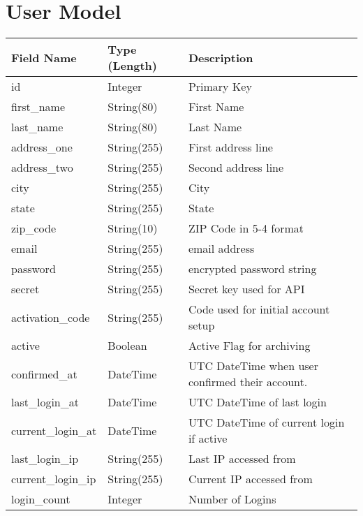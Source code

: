 \documentclass[letterpaper,10pt,english]{sphinxmanual}
\begin{document}
\section{User Model}
\label{dev-models:user-model-label}\label{dev-models:user-model}
\begin{tabulary}{\linewidth}{|L|L|L|}
\hline
\textsf{\relax 
Field Name
} & \textsf{\relax 
Type (Length)
} & \textsf{\relax 
Description
}\\
\hline
id
 & 
Integer
 & 
Primary Key
\\

first\_name
 & 
String(80)
 & 
First Name
\\

last\_name
 & 
String(80)
 & 
Last Name
\\

address\_one
 & 
String(255)
 & 
First address line
\\

address\_two
 & 
String(255)
 & 
Second address line
\\

city
 & 
String(255)
 & 
City
\\

state
 & 
String(255)
 & 
State
\\

zip\_code
 & 
String(10)
 & 
ZIP Code in 5-4 format
\\

email
 & 
String(255)
 & 
email address
\\

password
 & 
String(255)
 & 
encrypted password string
\\

secret
 & 
String(255)
 & 
Secret key used for API
\\

activation\_code
 & 
String(255)
 & 
Code used for initial account setup
\\

active
 & 
Boolean
 & 
Active Flag for archiving
\\

confirmed\_at
 & 
DateTime
 & 
UTC DateTime when user confirmed
their account.
\\

last\_login\_at
 & 
DateTime
 & 
UTC DateTime of last login
\\

current\_login\_at
 & 
DateTime
 & 
UTC DateTime of current login if active
\\

last\_login\_ip
 & 
String(255)
 & 
Last IP accessed from
\\

current\_login\_ip
 & 
String(255)
 & 
Current IP accessed from
\\

login\_count
 & 
Integer
 & 
Number of Logins
\\
\hline\end{tabulary}
\end{document}
